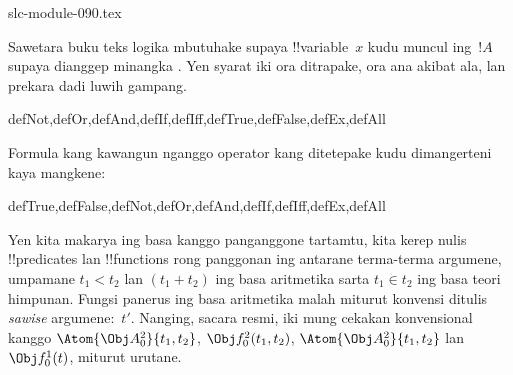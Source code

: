 \begin{filecontents*}[overwrite]{slc-module-090.tex}
\begin{intro}
Sawetara buku teks logika mbutuhake supaya !!{variable}~$x$ kudu
muncul ing~$!A$ supaya
%
%
%
dianggep minangka
.
Yen syarat iki ora ditrapake, ora ana akibat ala, lan prekara dadi
luwih gampang.
\end{intro}

\begin{tagblock}{defNot,defOr,defAnd,defIf,defIff,defTrue,defFalse,defEx,defAll}
\begin{defn}
Formula kang kawangun nganggo operator kang ditetepake kudu dimangerteni
kaya mangkene:

\begin{tagenumerate}{defTrue,defFalse,defNot,defOr,defAnd,defIf,defIff,defEx,defAll}









\end{tagenumerate}
\end{defn}
\end{tagblock}

Yen kita makarya ing basa kanggo panganggone tartamtu, kita kerep
nulis !!{predicate}s lan !!{function}s rong panggonan ing antarane
terma-terma argumene, umpamane $t_1 < t_2$ lan $(t_1 + t_2)$ ing basa
aritmetika sarta $t_1 \in t_2$ ing basa teori himpunan. Fungsi
panerus ing basa aritmetika malah miturut konvensi ditulis \emph{sawise}
argumene:~$t'$. Nanging, sacara resmi, iki mung cekakan konvensional
kanggo $\Atom{\Obj A^2_0}{t_1, t_2}$,
$\Obj f^2_0(t_1, t_2)$, $\Atom{\Obj A^2_0}{t_1, t_2}$ lan $\Obj f^1_0(t)$,
miturut urutane.


\end{filecontents*}
